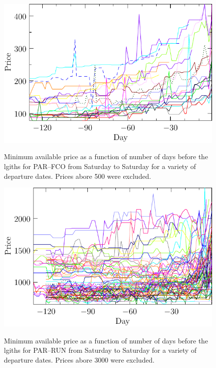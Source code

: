\documentclass{article}
\begin{document}
\begin{figure}
  \begin{center}
    \includegraphics{pdf/PARFCO_SAT_7_nonorm}
    \label{PARFCO_SAT_7_nonorm}
    \caption{Minimum available price as a function of number of days
      before the lgiths for PAR--FCO from Saturday to Saturday for a
      variety of departure dates. Prices abore 500 were excluded.}
  \end{center}
\end{figure}

\begin{figure}
  \begin{center}
    \includegraphics{pdf/PARRUN_SAT_7_nonorm}
    \label{PARRUN_SAT_7_nonorm}
    \caption{Minimum available price as a function of number of days
      before the lgiths for PAR--RUN from Saturday to Saturday for a
      variety of departure dates. Prices abore 3000 were excluded.}
  \end{center}
\end{figure}
\end{document}
